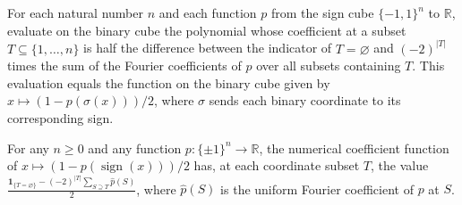 \begin{theorem}
\leanok
{}
For each natural number $n$ and each function $p$ from the sign cube $\{-1,1\}^n$ to
$\mathbb R$, evaluate on the binary cube the polynomial whose coefficient at a subset
$T\subseteq\{1,\ldots,n\}$ is half the difference between the indicator of
$T=\varnothing$ and $(-2)^{|T|}$ times the sum of the Fourier coefficients of $p$ over
all subsets containing $T$. This evaluation equals the function on the binary cube given
by $x\mapsto (1-p(\sigma(x)))/2$, where $\sigma$ sends each binary coordinate to its
corresponding sign.
\end{theorem}

\begin{theorem}
\leanok
{}
For any $n\ge 0$ and any function $p:\{\pm1\}^n\to\mathbb{R}$, the numerical coefficient
function of $x\mapsto (1-p(\operatorname{sign}(x)))/2$ has, at each coordinate subset
$T$, the value $\displaystyle
\frac{\mathbf{1}_{\{T=\varnothing\}}-(-2)^{|T|}\sum_{S\supseteq T}\widehat p(S)}{2}$,
where $\widehat p(S)$ is the uniform Fourier coefficient of $p$ at $S$.
\end{theorem}


